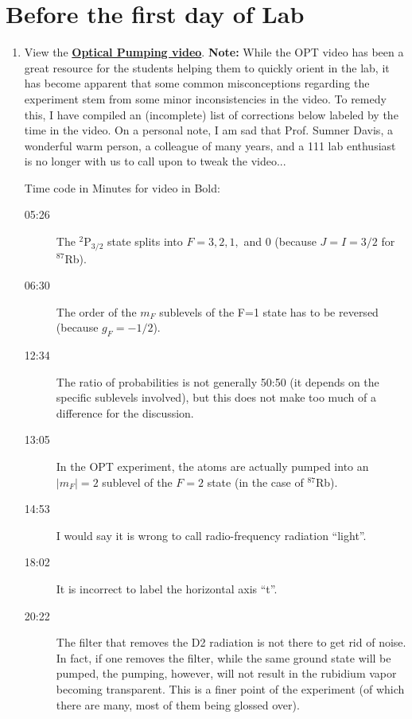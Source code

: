 \documentclass{../lab}
\newcommand{\OpticalPumpingVideo}{https://www.youtube.com/watch?v=v4StxGAhm8Y}
\begin{document}
\section{Before the first day of Lab}
\begin{enumerate}
    \item View the \href{\OpticalPumpingVideo}{\textbf{Optical Pumping video}}.
    \textbf{Note:} While the OPT video has been a great resource for the students helping them to quickly orient in the lab, it has become apparent that some common misconceptions regarding the experiment stem from some minor inconsistencies in the video. To remedy this, I have compiled an (incomplete) list of corrections below labeled by the time in the video. On a personal note, I am sad that Prof. Sumner Davis, a wonderful warm person, a colleague of many years, and a 111 lab enthusiast is no longer with us to call upon to tweak the video...

    Time code in Minutes for video in Bold:

    \begin{description}
        \item [05:26] The $^2$P$_{3/2}$ state splits into $F = 3,2,1,$ and 0 (because $J = I = 3/2$ for $^{87}$Rb).

        \item [06:30] The order of the $m_F$ sublevels of the F=1 state has to be reversed (because $g_F = -1/2$).

        \item [12:34] The ratio of probabilities is not generally 50:50 (it depends on the specific sublevels involved), but this does not make too much of a difference for the discussion.

        \item [13:05] In the OPT experiment, the atoms are actually pumped into an $|m_F|=2$ sublevel of the $F = 2$ state (in the case of $^{87}$Rb).

        \item [14:53] I would say it is wrong to call radio-frequency radiation ``light''.

        \item [18:02] It is incorrect to label the horizontal axis ``t''.

        \item [20:22] The filter that removes the D2 radiation is not there to get rid of noise. In fact, if one removes the filter, while the same ground state will be pumped, the pumping, however, will not result in the rubidium vapor becoming transparent. This is a finer point of the experiment (of which there are many, most of them being glossed over).
    \end{description}


\end{enumerate}
\end{document}

